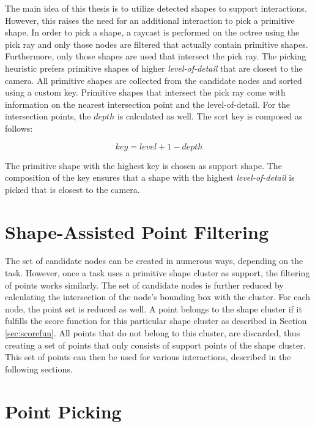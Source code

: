 The main idea of this thesis is to utilize detected shapes to support interactions. However, this raises the need for an additional interaction to pick a primitive shape. In order to pick a shape, a raycast is performed on the octree using the pick ray and only those nodes are filtered that actually contain primitive shapes. Furthermore, only those shapes are used that intersect the pick ray. The picking heuristic prefers primitive shapes of higher \textit{level-of-detail} that are closest to the camera. All primitive shapes are collected from the candidate nodes and sorted using a custom key. Primitive shapes that intersect the pick ray come with information on the nearest intersection point and the level-of-detail. For the intersection points, the $depth$ is calculated as well. The sort key is composed as follows: 

$$key = level + 1 - depth$$

The primitive shape with the highest key is chosen as support shape. The composition of the key ensures that a shape with the highest \textit{level-of-detail} is picked that is closest to the camera.


\section{Shape-Assisted Point Filtering}
\label{sec:pointFiltering}

The set of candidate nodes can be created in numerous ways, depending on the task. However, once a task uses a primitive shape cluster as support, the filtering of points works similarly. The set of candidate nodes is further reduced by calculating the intersection of the node's bounding box with the cluster. For each node, the point set is reduced as well. A point belongs to the shape cluster if it fulfills the score function for this particular shape cluster as described in Section \ref{sec:scorefun}. All points that do not belong to this cluster, are discarded, thus creating a set of points that only consists of support points of the shape cluster. This set of points can then be used for various interactions, described in the following sections. 

\section{Point Picking}
\label{sec:pointPicking}


